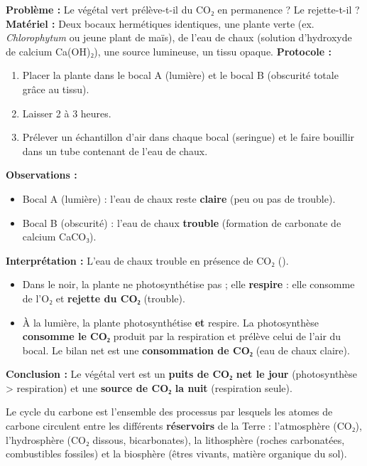 \documentclass[11pt]{article}
\newcommand{\cle}[1]{{\popxbold\color{popdark}#1}}
\begin{document}
\begin{experience}
\textbf{Problème :} Le végétal vert prélève-t-il du CO₂ en permanence ? Le rejette-t-il ?
\textbf{Matériel :} Deux bocaux hermétiques identiques, une plante verte (ex. \emph{Chlorophytum} ou jeune plant de maïs), de l'eau de chaux (solution d'hydroxyde de calcium Ca(OH)₂), une source lumineuse, un tissu opaque.
\textbf{Protocole :}
\begin{enumerate}
    \item Placer la plante dans le bocal A (lumière) et le bocal B (obscurité totale grâce au tissu).
    \item Laisser 2 à 3 heures.
    \item Prélever un échantillon d'air dans chaque bocal (seringue) et le faire bouillir dans un tube contenant de l'eau de chaux.
\end{enumerate}
\textbf{Observations :}
\begin{itemize}
    \item Bocal A (lumière) : l'eau de chaux reste \textbf{claire} (peu ou pas de trouble).
    \item Bocal B (obscurité) : l'eau de chaux \textbf{trouble} (formation de carbonate de calcium CaCO₃).
\end{itemize}
\textbf{Interprétation :} L'eau de chaux trouble en présence de CO₂ ().
\begin{itemize}
    \item Dans le noir, la plante ne photosynthétise pas ; elle \textbf{respire} : elle consomme de l'O₂ et \textbf{rejette du CO₂} (trouble).
    \item À la lumière, la plante photosynthétise \textbf{et} respire. La photosynthèse \textbf{consomme le CO₂} produit par la respiration et prélève celui de l'air du bocal. Le bilan net est une \textbf{consommation de CO₂} (eau de chaux claire).
\end{itemize}
\textbf{Conclusion :} Le végétal vert est un \textbf{puits de CO₂ net le jour} (photosynthèse > respiration) et une \textbf{source de CO₂ la nuit} (respiration seule).
\end{experience}

\begin{definition}
Le \cle{cycle du carbone} est l'ensemble des processus par lesquels les atomes de carbone circulent entre les différents \textbf{réservoirs} de la Terre : l'atmosphère (CO₂), l'hydrosphère (CO₂ dissous, bicarbonates), la lithosphère (roches carbonatées, combustibles fossiles) et la biosphère (êtres vivants, matière organique du sol).
\end{definition}
\end{document}
